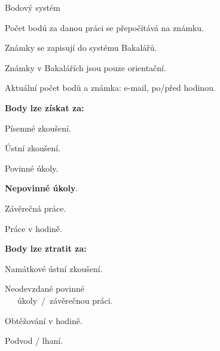 \documentclass[aspectratio=1610]{beamer}
\begin{document}
\begin{frame}{Bodový systém}
    \begin{cardTiny}
        \begin{flushleft}
            Počet bodů za danou práci se přepočítává na známku.

            Známky se zapisují do systému Bakalářů.

            Známky v Bakalářích jsou pouze orientační.

            Aktuální počet bodů a známka: e-mail, po/před hodinou.
        \end{flushleft}
    \end{cardTiny}
    \begin{multicols}{2}
        \centering
        
        \begin{cardTiny}
            \textbf{Body lze získat za:}
        
            \begin{flushleft}
            Písemné zkoušení.

            Ústní zkoušení.

            Povinné úkoly.

            \textbf{Nepovinné úkoly}.

            Závěrečná práce.

            Práce v hodině.
            \end{flushleft}
        \end{cardTiny}
        
        \begin{cardTiny}
            \textbf{Body lze ztratit za:}
            
            \begin{flushleft}
            Namátkové ústní zkoušení.

            Neodevzdané povinné\\~~~úkoly~/~závěrečnou práci.

            Obtěžování v hodině.

            Podvod / lhaní.
            \end{flushleft}
        \end{cardTiny}
    \end{multicols}
\end{frame}
\end{document}
